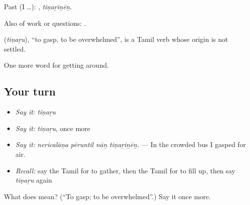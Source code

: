 Past (I …): , \emph{tiṇaṟiṉēṉ}.

Also of work or questions:    .

\begin{cousinweb}
\textbf{} (\emph{tiṇaṟu}), \textquotedblleft{}to gasp, to be overwhelmed\textquotedblright{}, is a Tamil verb whose origin is not settled.
\end{cousinweb}

\begin{grammarlens}[title={What you've built}]
One more word for getting around.
\end{grammarlens}

\subsection*{Your turn}
\begin{itemize}
\raggedright
  \item \emph{Say it:} \emph{tiṇaṟu}
  \item \emph{Say it:} \emph{tiṇaṟu}, once more
  \item \emph{Say it:} \emph{nericalāṉa pēruntil nāṉ tiṇaṟiṉēṉ.} — In the crowded bus I gasped for air.
  \item \emph{Recall:} say the Tamil for to gather, then the Tamil for to fill up, then say \emph{tiṇaṟu} again
\end{itemize}

\begin{tcolorbox}[breakable,colback=teal!4,colframe=teal!35!black,title={Before you move on}]
What does  mean? (\textquotedblleft{}To gasp; to be overwhelmed\textquotedblright{}.) Say it once more.
\end{tcolorbox}
